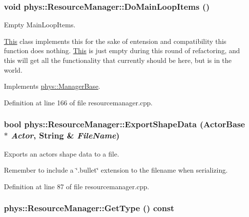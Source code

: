 \hypertarget{classphys_1_1ResourceManager_a2114714999441c095bc28d3673c2490e}{
\subsubsection[{DoMainLoopItems}]{\setlength{\rightskip}{0pt plus 5cm}void phys::ResourceManager::DoMainLoopItems ()}}
\label{d1/d35/classphys_1_1ResourceManager_a2114714999441c095bc28d3673c2490e}


Empty MainLoopItems. 

\hyperlink{structThis}{This} class implements this for the sake of entension and compatibility this function does nothing. \hyperlink{structThis}{This} is just empty during this round of refactoring, and this will get all the functionality that currently should be here, but is in the world. 

Implements \hyperlink{classphys_1_1ManagerBase_aa9e13a3f7c398b708f0f242610b5abf7}{phys::ManagerBase}.



Definition at line 166 of file resourcemanager.cpp.

\hypertarget{classphys_1_1ResourceManager_a3b3f3b97be1bcac74171a9fbfa90ebe7}{
\subsubsection[{ExportShapeData}]{\setlength{\rightskip}{0pt plus 5cm}bool phys::ResourceManager::ExportShapeData ({\bf ActorBase} $\ast$ {\em Actor}, \/  {\bf String} \& {\em FileName})}}
\label{d1/d35/classphys_1_1ResourceManager_a3b3f3b97be1bcac74171a9fbfa90ebe7}


Exports an actors shape data to a file. 

Remember to include a \char`\"{}.bullet\char`\"{} extension to the filename when serializing. 

Definition at line 87 of file resourcemanager.cpp.

\hypertarget{classphys_1_1ResourceManager_a9e5468e5428f5c108c7b3c01e94eba46}{
\subsubsection[{GetType}]{ phys::ResourceManager::GetType () const}}
\label{d1/d35/classphys_1_1ResourceManager_a9e5468e5428f5c108c7b3c01e94eba46}


